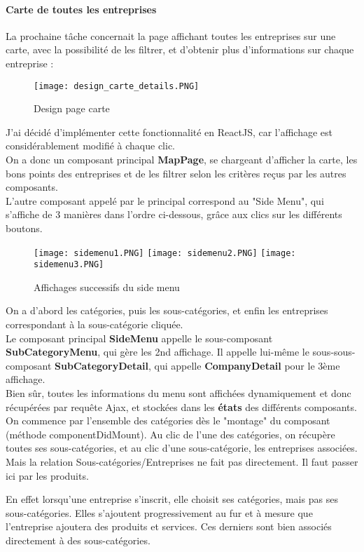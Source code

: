 \paragraph{Carte de toutes les entreprises}

La prochaine tâche concernait la page affichant toutes les entreprises sur une carte, avec la possibilité de les filtrer, et d'obtenir plus d'informations sur chaque entreprise :

\begin{figure}[H]
    \centering
    \texttt{[image: design\_carte\_details.PNG]}
    \caption{Design page carte}
\end{figure}

J'ai décidé d'implémenter cette fonctionnalité en ReactJS, car l'affichage est considérablement modifié à chaque clic.
\\On a donc un composant principal \textbf{MapPage}, se chargeant d'afficher la carte, les bons points des entreprises et de les filtrer selon les critères reçus par les autres composants.
\\L'autre composant appelé par le principal correspond au "Side Menu", qui s'affiche de 3 manières dans l'ordre ci-dessous, grâce aux clics sur les différents boutons.

\begin{figure}[H]
    \texttt{[image: sidemenu1.PNG]}
    \texttt{[image: sidemenu2.PNG]}
    \texttt{[image: sidemenu3.PNG]}
    \caption{Affichages successifs du side menu}
\end{figure}

On a d'abord les catégories, puis les sous-catégories, et enfin les entreprises correspondant à la sous-catégorie cliquée.
\\Le composant principal \textbf{SideMenu} appelle le sous-composant \textbf{SubCategoryMenu}, qui gère les 2nd affichage. 
Il appelle lui-même le sous-sous-composant \textbf{SubCategoryDetail}, qui appelle \textbf{CompanyDetail} pour le 3ème affichage.\\

Bien sûr, toutes les informations du menu sont affichées dynamiquement et donc récupérées par requête Ajax, et stockées dans les \textbf{états} des différents composants.\\
On commence par l'ensemble des catégories dès le "montage" du composant (méthode componentDidMount).
Au clic de l'une des catégories, on récupère toutes ses sous-catégories, et au clic d'une sous-catégorie, les entreprises associées.
Mais la relation Sous-catégories/Entreprises ne fait pas directement. 
Il faut passer ici par les produits. 
\begin{myboxedtext}
En effet lorsqu'une entreprise s'inscrit, elle choisit ses catégories, mais pas ses sous-catégories. Elles s'ajoutent progressivement au fur et à mesure que l'entreprise ajoutera des produits et services.
Ces derniers sont bien associés directement à des sous-catégories.
\end{myboxedtext}

